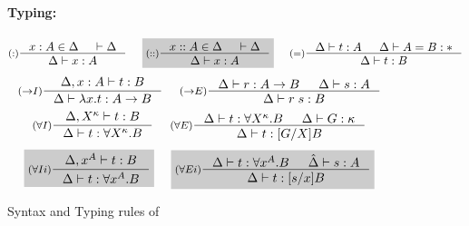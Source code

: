 \begin{figure}
\paragraph{Typing:}
\[ \inference[($:$)]{x:A \in \Delta & |- \Delta} 
                    {\Delta |- x:A}
 ~~~~ \newFi{
   \inference[($::$)]{x::A \in \Delta & |- \Delta} 
                     {\Delta |- x:A} }
 ~~~~
   \inference[($=$)]{\Delta |- t :A & \Delta |- A = B : *}
                    {\Delta |- t : B}
\]
\[
   \inference[($->$$I$)]{\Delta, x:A |- t : B}
                        {\Delta |- \lambda x.t : A -> B}
 ~~~~
   \inference[($->$$E$)]{\Delta |- r : A -> B & \Delta |- s : A}
                        {\Delta |- r\;s : B}
\]
\[ \inference[($\forall I$)]{\Delta, X^\kappa |- t : B}
                            {\Delta |- t : \forall X^\kappa.B}
 ~~~~
   \inference[($\forall E$)]{ \Delta |- t : \forall X^\kappa.B
                            & \Delta |- G:\kappa }
                            {\Delta |- t : [G/X]B}
\]
\[ \newFi{
   \inference[($\forall I i$)]{\Delta, x^A |- t : B}
                              {\Delta |- t : \forall x^A.B} }
 ~~~~ \newFi{
   \inference[($\forall E i$)]{\Delta |- t : \forall x^A.B & \hat\Delta |- s:A}
                              {\Delta |- t : [s/x]B} }
\]
\caption{Syntax and Typing rules of \Fi}
\label{fig:Fi}
\end{figure}

